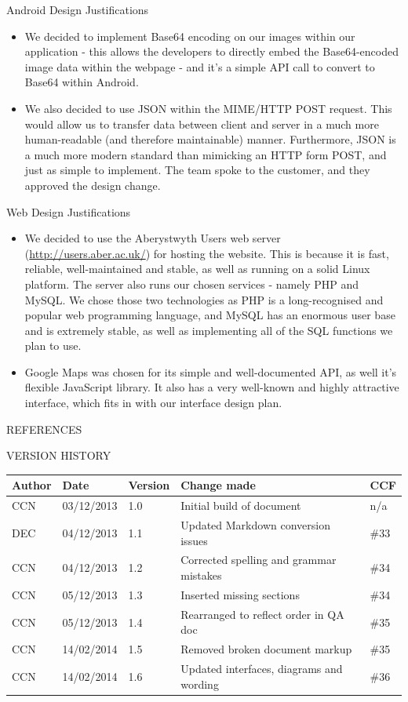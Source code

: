 \documentclass{article}
\newcommand{\versionhistory}{
		\begin{tabularx}{\linewidth}{| p{2cm} | p{2cm} | p{2cm} | X | p{1cm} |}
			\hline
			\bf{Author} & \bf{Date} & \bf{Version} & \bf{Change made} & {\bf CCF}\\
			\hline
			CCN & 03/12/2013 & 1.0 & Initial build of document & n/a \\
			\hline
			DEC & 04/12/2013 & 1.1 & Updated Markdown conversion issues & \#33 \\
			\hline
			CCN & 04/12/2013 & 1.2 & Corrected spelling and grammar mistakes & \#34 \\
			\hline
			CCN & 05/12/2013 & 1.3 & Inserted missing sections & \#34 \\
			\hline
			CCN & 05/12/2013 & 1.4 & Rearranged to reflect order in QA doc & \#35 \\
			\hline
			CCN & 14/02/2014 & 1.5 & Removed broken document markup & \#35 \\
			\hline
			CCN & 14/02/2014 & 1.6 & Updated interfaces, diagrams and wording & \#36 \\
			\hline
		\end{tabularx}
}
\begin{document}
\clearpage
\begin{section}{Android Design Justifications}
	\begin{itemize}
		\item{We decided to implement Base64 encoding on our images within our application - this allows the developers to directly embed the Base64-encoded image data within the webpage - and it's a simple API call to convert to Base64 within Android.}
		\item{We also decided to use JSON within the MIME/HTTP POST request. This would allow us to transfer data between client and server in a much more human-readable (and therefore maintainable) manner. Furthermore, JSON is a much more modern standard than mimicking an HTTP form POST, and just as simple to implement. The team spoke to the customer, and they approved the design change.}
	\end{itemize}
\end{section}

\begin{section}{Web Design Justifications}
	\begin{itemize}
		\item{We decided to use the Aberystwyth Users web server (\href{users.aber.ac.uk}{http://users.aber.ac.uk/}) for hosting the website. This is because it is fast, reliable, well-maintained and stable, as well as running on a solid Linux platform. The server also runs our chosen services - namely PHP and MySQL. We chose those two technologies as PHP is a long-recognised and popular web programming language, and MySQL has an enormous user base and is extremely stable, as well as implementing all of the SQL functions we plan to use.}
		\item{Google Maps was chosen for its simple and well-documented API, as well it's flexible JavaScript library. It also has a very well-known and highly attractive interface, which fits in with our interface design plan.}
	\end{itemize}
\end{section}

\nocite{LaTeXTemplate} %
\nocite{LaTeXListings}
\nocite{LaTeXListings2}
\nocite{LaTeXListings3}
\nocite{JavaScriptReference}
\nocite{AndroidReference}

\newpage
\begin{section}{REFERENCES}
	
	
\end{section}

\vspace{1cm}
\begin{section}{VERSION HISTORY}
	\versionhistory
\end{section}
\end{document}
